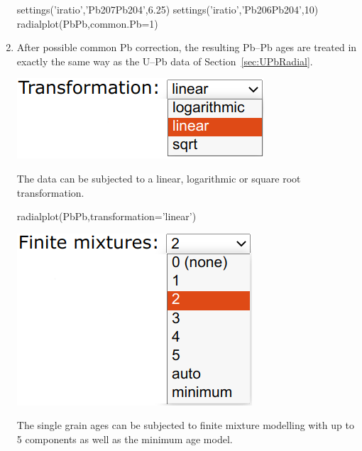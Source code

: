 \begin{refsection}
\begin{enumerate}
\begin{console}
settings('iratio','Pb207Pb204',6.25)
settings('iratio','Pb206Pb204',10)
radialplot(PbPb,common.Pb=1)
\end{console}

\item After possible common Pb correction, the resulting Pb--Pb ages
  are treated in exactly the same way as the U--Pb data of
  Section~\ref{sec:UPbRadial}.

\noindent\begin{minipage}[t]{.3\linewidth}
\strut\vspace*{-\baselineskip}\newline
\includegraphics[width=\linewidth]{../figures/PbPbRadialTransformations.png}
\end{minipage}
\begin{minipage}[t]{.7\linewidth}
The data can be subjected to a linear, logarithmic or square root
transformation.
\end{minipage}

\begin{console}
radialplot(PbPb,transformation='linear')
\end{console}

\noindent\begin{minipage}[t]{.3\linewidth}
\strut\vspace*{-\baselineskip}\newline
\includegraphics[width=\linewidth]{../figures/PbPbRadialMixtures.png}
\end{minipage}
\begin{minipage}[t]{.7\linewidth}
  The single grain ages can be subjected to finite mixture modelling
  with up to 5 components as well as the minimum age model.
\end{minipage}


\end{enumerate}
\end{refsection}
